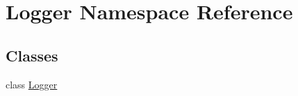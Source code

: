 \hypertarget{namespaceLogger}{\section{Logger Namespace Reference}
\label{namespaceLogger}
}
\subsection*{Classes}
\begin{DoxyCompactItemize}
\item 
class \hyperlink{classLogger_1_1Logger}{Logger}
\end{DoxyCompactItemize}
